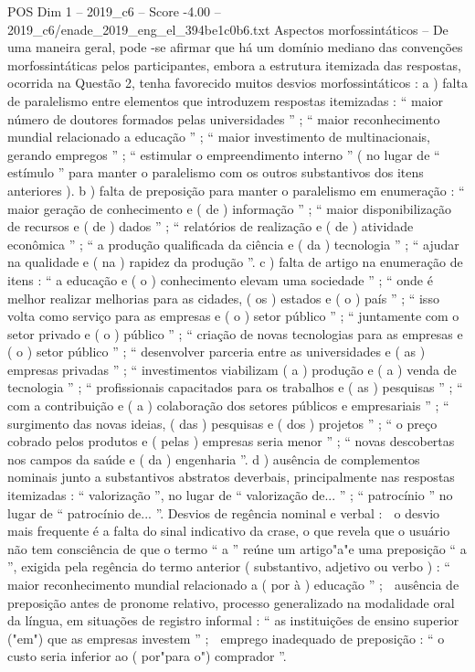 \begin{textsample}{POS Dim 1 – 2019\_c6 – Score -4.00 – 2019\_c6/enade\_2019\_eng\_el\_394be1c0b6.txt}
Aspectos morfossintáticos – De uma maneira geral, pode -se afirmar que há um domínio mediano das convenções morfossintáticas pelos participantes, embora a estrutura itemizada das respostas, ocorrida na Questão 2, tenha favorecido muitos desvios morfossintáticos : a ) falta de paralelismo entre elementos que introduzem respostas itemizadas : “ maior número de doutores formados pelas universidades ” ; “ maior reconhecimento mundial relacionado a educação ” ; “ maior investimento de multinacionais, gerando empregos ” ; “ estimular o empreendimento interno ” ( no lugar de “ estímulo ” para manter o paralelismo com os outros substantivos dos itens anteriores ). b ) falta de preposição para manter o paralelismo em enumeração : “ maior geração de conhecimento e ( de ) informação ” ; “ maior disponibilização de recursos e ( de ) dados ” ; “ relatórios de realização e ( de ) atividade econômica ” ; “ a produção qualificada da ciência e ( da ) tecnologia ” ; “ ajudar na qualidade e ( na ) rapidez da produção ”. c ) falta de artigo na enumeração de itens : “ a educação e ( o ) conhecimento elevam uma sociedade ” ; “ onde é melhor realizar melhorias para as cidades, ( os ) estados e ( o ) país ” ; “ isso volta como serviço para as empresas e ( o ) setor público ” ; “ juntamente com o setor privado e ( o ) público ” ; “ criação de novas tecnologias para as empresas e ( o ) setor público ” ; “ desenvolver parceria entre as universidades e ( as ) empresas privadas ” ; “ investimentos viabilizam ( a ) produção e ( a ) venda de tecnologia ” ; “ profissionais capacitados para os trabalhos e ( as ) pesquisas ” ; “ com a contribuição e ( a ) colaboração dos setores públicos e empresariais ” ; “ surgimento das novas ideias, ( das ) pesquisas e ( dos ) projetos ” ; “ o preço cobrado pelos produtos e ( pelas ) empresas seria menor ” ; “ novas descobertas nos campos da saúde e ( da ) engenharia ”. d ) ausência de complementos nominais junto a substantivos abstratos deverbais, principalmente nas respostas itemizadas : “ valorização ”, no lugar de “ valorização de... ” ; “ patrocínio ” no lugar de “ patrocínio de... ”.
Desvios de regência nominal e verbal :  o desvio mais frequente é a falta do sinal indicativo da crase, o que revela que o usuário não tem consciência de que o termo “ a ” reúne um artigo"a"e uma preposição “ a ”, exigida pela regência do termo anterior ( substantivo, adjetivo ou verbo ) : “ maior reconhecimento mundial relacionado a ( por à ) educação ” ;  ausência de preposição antes de pronome relativo, processo generalizado na modalidade oral da língua, em situações de registro informal : “ as instituições de ensino superior ("em") que as empresas investem ” ;  emprego inadequado de preposição : “ o custo seria inferior ao ( por"para o") comprador ”.

\end{textsample}
